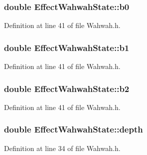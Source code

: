 \subsubsection[{\texorpdfstring{b0}{b0}}]{\setlength{\rightskip}{0pt plus 5cm}double Effect\+Wahwah\+State\+::b0}\hypertarget{class_effect_wahwah_state_a6047202695f62805b82f4f9adc880fdc}{}\label{class_effect_wahwah_state_a6047202695f62805b82f4f9adc880fdc}


Definition at line 41 of file Wahwah.\+h.

\subsubsection[{\texorpdfstring{b1}{b1}}]{\setlength{\rightskip}{0pt plus 5cm}double Effect\+Wahwah\+State\+::b1}\hypertarget{class_effect_wahwah_state_a2d7c3d4f06c52d44f2c9dee6be278af6}{}\label{class_effect_wahwah_state_a2d7c3d4f06c52d44f2c9dee6be278af6}


Definition at line 41 of file Wahwah.\+h.

\subsubsection[{\texorpdfstring{b2}{b2}}]{\setlength{\rightskip}{0pt plus 5cm}double Effect\+Wahwah\+State\+::b2}\hypertarget{class_effect_wahwah_state_a48f60ec328aaa607252b1ffcf6bcb370}{}\label{class_effect_wahwah_state_a48f60ec328aaa607252b1ffcf6bcb370}


Definition at line 41 of file Wahwah.\+h.

\subsubsection[{\texorpdfstring{depth}{depth}}]{\setlength{\rightskip}{0pt plus 5cm}double Effect\+Wahwah\+State\+::depth}\hypertarget{class_effect_wahwah_state_ac296631285e0b098e548e8415530374e}{}\label{class_effect_wahwah_state_ac296631285e0b098e548e8415530374e}


Definition at line 34 of file Wahwah.\+h.

